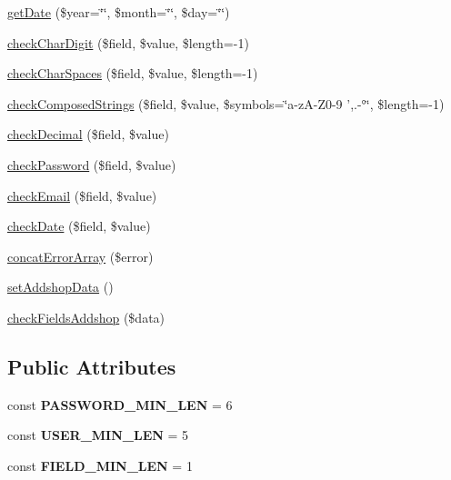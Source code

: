 \begin{DoxyCompactItemize}
\hyperlink{classBasePageController_a2aaad6f0fa836c9d7e6d9df5974cb4a7}{get\+Date} (\$year=\char`\"{}\char`\"{}, \$month=\char`\"{}\char`\"{}, \$day=\char`\"{}\char`\"{})
\item 
\hyperlink{classBasePageController_ade6dad738c6fce22cf8b44028628090d}{check\+Char\+Digit} (\$field, \$value, \$length=-\/1)
\item 
\hyperlink{classBasePageController_ab4d71880bb1227a04df998de6cfc0f34}{check\+Char\+Spaces} (\$field, \$value, \$length=-\/1)
\item 
\hyperlink{classBasePageController_aaf4afedf5bb714c46c29e007eb095e55}{check\+Composed\+Strings} (\$field, \$value, \$symbols=\char`\"{}a-\/z\+A-\/Z0-\/9 ',.-\/°\char`\"{}, \$length=-\/1)
\item 
\hyperlink{classBasePageController_ad79d970cb91298dfa2206bfe22516618}{check\+Decimal} (\$field, \$value)
\item 
\hyperlink{classBasePageController_a6829b94ed721619b43879475c75b8fc8}{check\+Password} (\$field, \$value)
\item 
\hyperlink{classBasePageController_a5a0788181caf223a4ce208702c93e0c8}{check\+Email} (\$field, \$value)
\item 
\hyperlink{classBasePageController_a6f1a0a900ee8f95b6b6f12c52272a9a7}{check\+Date} (\$field, \$value)
\item 
\hyperlink{classBasePageController_ac0083ad81bbac88f3ca4bdf258566a07}{concat\+Error\+Array} (\$error)
\item 
\hyperlink{classBasePageController_a153a1dcf2e23be9499f8083828671c26}{set\+Addshop\+Data} ()
\item 
\hyperlink{classBasePageController_aa71c4d8a5aa7b90d2074e511fe4ddcc2}{check\+Fields\+Addshop} (\$data)
\end{DoxyCompactItemize}
\subsection*{Public Attributes}
\begin{DoxyCompactItemize}
\item 
\hypertarget{classBasePageController_a35247fc10b6367518b2232ea4d5ca90a}{const {\bfseries P\+A\+S\+S\+W\+O\+R\+D\+\_\+\+M\+I\+N\+\_\+\+L\+E\+N} = 6}\label{classBasePageController_a35247fc10b6367518b2232ea4d5ca90a}

\item 
\hypertarget{classBasePageController_acc0b220a790dddcd88a8ff7fd8fb88c9}{const {\bfseries U\+S\+E\+R\+\_\+\+M\+I\+N\+\_\+\+L\+E\+N} = 5}\label{classBasePageController_acc0b220a790dddcd88a8ff7fd8fb88c9}

\item 
\hypertarget{classBasePageController_a038012b54b56da5c27dbfc773ce75b00}{const {\bfseries F\+I\+E\+L\+D\+\_\+\+M\+I\+N\+\_\+\+L\+E\+N} = 1}\label{classBasePageController_a038012b54b56da5c27dbfc773ce75b00}

\end{DoxyCompactItemize}
